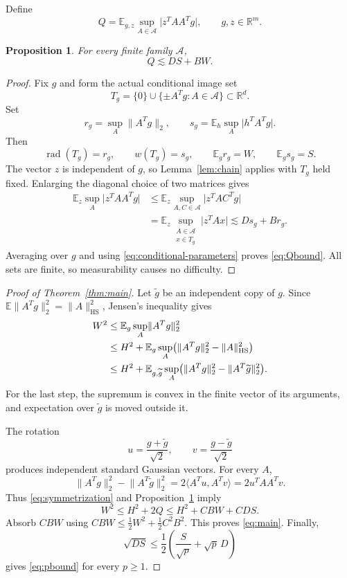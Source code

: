 \documentclass[11pt,a4paper]{article}
\numberwithin{equation}{section}
\newtheorem{proposition}[theorem]{Proposition}
\theoremstyle{remark}
\newcommand{\E}{\mathbb E}
\newcommand{\R}{\mathbb R}
\newcommand{\cA}{\mathcal A}
\newcommand{\norm}[1]{\lVert #1\rVert}
\newcommand{\abs}[1]{\lvert #1\rvert}
\newcommand{\ip}[2]{\langle #1,#2\rangle}
\newcommand{\HS}{\mathrm{HS}}
\newcommand{\rad}{\operatorname{rad}}
\begin{document}
Define
\begin{equation}
 Q=\E_{g,z}\sup_{A\in\cA}\abs{z^TAA^Tg},
 \qquad g,z\in\R^m.
 \label{eq:Q}
\end{equation}

\begin{proposition}\label{prop:Q}
For every finite family $\cA$,
\begin{equation}
 \boxed{\quad Q\lesssim DS+BW.\quad}
 \label{eq:Qbound}
\end{equation}
\end{proposition}

\begin{proof}
Fix $g$ and form the actual conditional image set
\[
 T_g=\{0\}\cup\{\pm A^Tg:A\in\cA\}\subset\R^d.
\]
Set
\[
 r_g=\sup_A\norm{A^Tg}_2,
 \qquad s_g=\E_h\sup_A\abs{h^TA^Tg}.
\]
Then
\begin{equation}
 \rad(T_g)=r_g,\qquad w(T_g)=s_g,
 \qquad \E_g r_g=W,\qquad \E_g s_g=S.
 \label{eq:conditional-parameters}
\end{equation}
The vector $z$ is independent of $g$, so Lemma~\ref{lem:chain} applies with $T_g$ held fixed. Enlarging the diagonal choice of two matrices gives
\begin{align*}
 \E_z\sup_A\abs{z^TAA^Tg}
 &\le \E_z\sup_{A,C\in\cA}\abs{z^TAC^Tg}\\
 &=\E_z\sup_{\substack{A\in\cA\\x\in T_g}}\abs{z^TAx}
 \lesssim D s_g+B r_g.
\end{align*}
Averaging over $g$ and using \eqref{eq:conditional-parameters} proves \eqref{eq:Qbound}. All sets are finite, so measurability causes no difficulty.
\end{proof}

\begin{proof}[Proof of Theorem~\ref{thm:main}]
Let $\widetilde g$ be an independent copy of $g$. Since
$\E\norm{A^Tg}_2^2=\norm{A}_{\HS}^2$, Jensen's inequality gives
\begin{align}
 W^2
 &\le \E_g\sup_A\norm{A^Tg}_2^2\notag\\
 &\le H^2+\E_g\sup_A\bigl(\norm{A^Tg}_2^2-\norm{A}_{\HS}^2\bigr)\notag\\
 &\le H^2+\E_{g,\widetilde g}\sup_A
 \bigl(\norm{A^Tg}_2^2-\norm{A^T\widetilde g}_2^2\bigr).
 \label{eq:symmetrization}
\end{align}
For the last step, the supremum is convex in the finite vector of its arguments, and expectation over $\widetilde g$ is moved outside it.

The rotation
\[
 u=\frac{g+\widetilde g}{\sqrt2},\qquad
 v=\frac{g-\widetilde g}{\sqrt2}
\]
produces independent standard Gaussian vectors. For every $A$,
\[
 \norm{A^Tg}_2^2-\norm{A^T\widetilde g}_2^2
 =2\ip{A^Tu}{A^Tv}=2u^TAA^Tv.
\]
Thus \eqref{eq:symmetrization} and Proposition~\ref{prop:Q} imply
\begin{equation}
 W^2\le H^2+2Q\le H^2+C BW+C DS.
 \label{eq:quadratic-closure}
\end{equation}
Absorb $CBW$ using
$CBW\le \tfrac12W^2+\tfrac12C^2B^2$.
This proves \eqref{eq:main}. Finally,
\[
 \sqrt{DS}\le\frac12\left(\frac{S}{\sqrt p}+\sqrt p\,D\right)
\]
gives \eqref{eq:pbound} for every $p\ge1$.
\end{proof}
\end{document}
